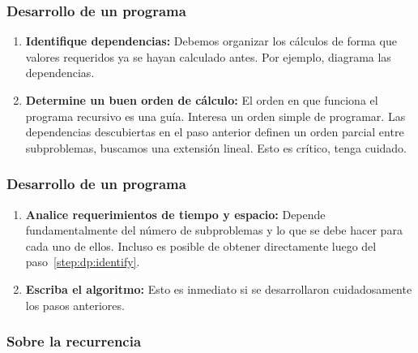 \documentclass[english, spanish, fleqn,%
hyperref = {colorlinks, urlcolor = blue}%
]{beamer}
\begin{document}
\begin{frame}
  \setcounter{beamerpauses}{2}
  \frametitle{Desarrollo de un programa}

  \begin{enumerate}[font = \textbf, label = {(\alph*)}, start = 5]
  \item \textbf{Identifique dependencias:}
    Debemos organizar los cálculos de forma que valores requeridos
    ya se hayan calculado antes.
    Por ejemplo,
    diagrama las dependencias.
  \item \textbf{Determine un buen orden de cálculo:}
    El orden en que funciona el programa recursivo es una guía.
    Interesa un orden simple de programar.
    Las dependencias descubiertas en el paso anterior
    definen un orden parcial entre subproblemas,
    buscamos una extensión lineal.
    Esto es crítico,
    tenga cuidado.
  \end{enumerate}
\end{frame}

\begin{frame}
  \setcounter{beamerpauses}{2}
  \frametitle{Desarrollo de un programa}

  \begin{enumerate}[font = \textbf, label = {(\alph*)}, start = 7]
  \item \textbf{Analice requerimientos de tiempo y espacio:}
    Depende fundamentalmente del número de subproblemas
    y lo que se debe hacer para cada uno de ellos.
    Incluso es posible de obtener directamente
    luego del paso~\ref{step:dp:identify}.
  \item \textbf{Escriba el algoritmo:}
    Esto es inmediato si se desarrollaron cuidadosamente los pasos anteriores.
  \end{enumerate}
\end{frame}

\begin{frame}
  \setcounter{beamerpauses}{2}
  \frametitle{Sobre la recurrencia}


\end{frame}
\end{document}
